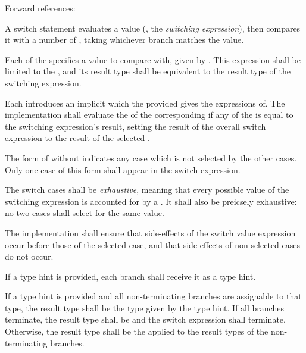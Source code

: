 Forward references: 

\specsubsubitem
A switch statement evaluates a value (, the
\textit{switching expression}), then compares it with a number of
, taking whichever branch matches the value.

\specsubsubitem
Each of the  specifies a value to compare with, given
by . This expression shall be limited to the
, and its result type shall be
equivalent to the result type of the switching expression.

\specsubsubitem
Each  introduces an implicit
 which the provided
 gives the expressions of. The implementation
shall evaluate the  of the corresponding
 if any of the  is equal to
the switching expression's result, setting the result of the overall switch
expression to the result of the selected .


\specsubsubitem
The form of  without 
indicates any case which is not selected by the other cases. Only one case of
this form shall appear in the switch expression.

\specsubsubitem
The switch cases shall be \textit{exhaustive}, meaning that every possible
value of the switching expression is accounted for by a
. It shall also be preicsely exhaustive: no two cases
shall select for the same value.

\specsubsubitem
The implementation shall ensure that side-effects of the switch value
expression occur before those of the selected case, and that side-effects of
non-selected cases do not occur.

\specsubsubitem
If a type hint is provided, each branch shall receive it as a type hint.

\specsubsubitem
If a type hint is provided and all non-terminating branches are assignable to
that type, the result type shall be the type given by the type hint. If all
branches terminate, the result type shall be  and the switch
expression shall terminate. Otherwise, the result type shall be the
 applied to the result types of the
non-terminating branches.

